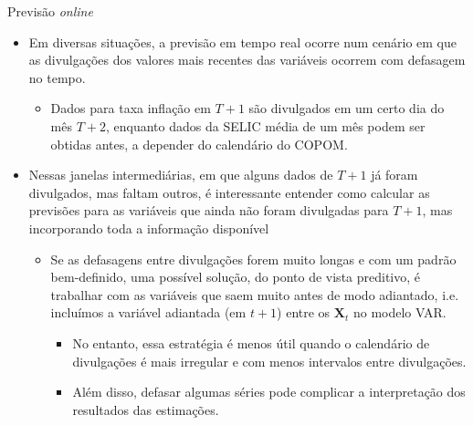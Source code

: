 \documentclass[11pt]{beamer}
\begin{document}
\begin{frame}{Previsão \textit{online}}
\begin{itemize}
	\item Em diversas situações, a previsão em tempo real ocorre num cenário em que as divulgações dos valores mais recentes das variáveis ocorrem com defasagem no tempo.
	\begin{itemize}
		\item Dados para taxa inflação em $T+1$ são divulgados em um certo dia do mês $T+2$, enquanto dados da SELIC média de um mês podem ser obtidas antes, a depender do calendário do COPOM.
	\end{itemize}
	\item Nessas janelas intermediárias, em que alguns dados de $T+1$ já foram divulgados, mas faltam outros, é interessante entender como calcular as previsões para as variáveis que ainda não foram divulgadas para $T+1$, mas incorporando {\color{blue}toda} a informação disponível
	\begin{itemize}
		\item Se as defasagens entre divulgações forem muito longas e com um padrão bem-definido, uma possível solução, do ponto de vista preditivo, é trabalhar com as variáveis que saem muito antes de modo adiantado, i.e. incluímos a variável adiantada (em $t+1$) entre os $\boldsymbol{X}_t$ no modelo VAR. 
	\begin{itemize}
		\item No entanto, essa estratégia é menos útil quando o calendário de divulgações é mais irregular e com menos intervalos entre divulgações.
		\item Além disso, defasar algumas séries pode complicar a interpretação dos resultados das estimações.
	\end{itemize}
\end{itemize}
\end{itemize}
\end{frame}
\end{document}
